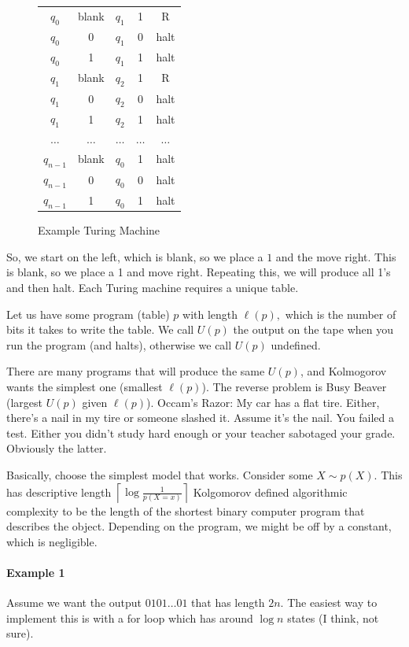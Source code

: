 \documentclass[12pt]{article}
\theoremstyle{remark}
\begin{document}
\newpage
\begin{figure}[h!]
\centering
\begin{tabular}{c|c||c|c|c}
\hline
$q_0$&blank&$q_1$&1&R\\
$q_0$&0&$q_1$&0&halt\\
$q_0$&1&$q_1$&1&halt\\
\hline
$q_1$&blank&$q_2$&1&R\\
$q_1$&0&$q_2$&0&halt\\
$q_1$&1&$q_2$&1&halt\\
\hline
$\dots$&$\dots$&$\dots$&$\dots$&$\dots$\\
\hline
$q_{n-1}$&blank&$q_0$&1&halt\\
$q_{n-1}$&0&$q_0$&0&halt\\
$q_{n-1}$&1&$q_0$&1&halt\\
\end{tabular}
\caption{Example Turing Machine}
\end{figure}

So, we start on the left, which is blank, so we place a $1$ and the move right. This is blank, so we place a 1 and move right. Repeating this, we will produce all 1's and then halt. Each Turing machine requires a unique table.

Let us have some program (table) $p$ with length $\ell(p),$ which is the number of bits it takes to write the table. We call $U(p)$ the output on the tape when you run the program (and halts), otherwise we call $U(p)$ undefined.    

There are many programs that will produce the same $U(p)$, and Kolmogorov wants the simplest one (smallest $\ell(p)$). The reverse problem is Busy Beaver (largest $U(p)$ given $\ell(p)$).
Occam's Razor: My car has a flat tire. Either, there's a nail in my tire or someone slashed it. Assume it's the nail. You failed a test. Either you didn't study hard enough or your teacher sabotaged your grade. Obviously the latter.

Basically, choose the simplest model that works. Consider some $X\sim p(X).$ This has descriptive length $\left\lceil\log\frac{1}{p(X=x)}\right\rceil$ Kolgomorov defined algorithmic complexity to be the length of the shortest binary computer program that describes the object. Depending on the program, we might be off by a constant, which is negligible. 
\paragraph{Example 1}
Assume we want the output $0101\dots01$ that has length $2n.$ The easiest way to implement this is with a for loop which has around $\log n$ states (I think, not sure).
\end{document}
